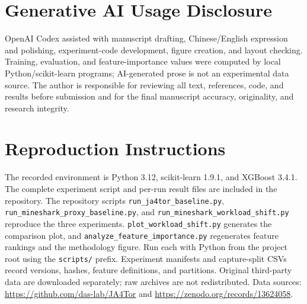 \documentclass[conference]{IEEEtran}
\begin{document}
\section{Generative AI Usage Disclosure}
OpenAI Codex assisted with manuscript drafting, Chinese/English expression and polishing, experiment-code development, figure creation, and layout checking. Training, evaluation, and feature-importance values were computed by local Python/scikit-learn programs; AI-generated prose is not an experimental data source. The author is responsible for reviewing all text, references, code, and results before submission and for the final manuscript accuracy, originality, and research integrity.


\appendix
\section{Reproduction Instructions}
The recorded environment is Python 3.12, scikit-learn 1.9.1, and XGBoost 3.4.1. The complete experiment script and per-run result files are included in the repository. The repository scripts \texttt{run\_ja4tor\_baseline.py}, \texttt{run\_mineshark\_proxy\_baseline.py}, and \texttt{run\_mineshark\_workload\_shift.py} reproduce the three experiments. \texttt{plot\_workload\_shift.py} generates the comparison plot, and \texttt{analyze\_feature\_importance.py} regenerates feature rankings and the methodology figure. Run each with Python from the project root using the \texttt{scripts/} prefix. Experiment manifests and capture-split CSVs record versions, hashes, feature definitions, and partitions. Original third-party data are downloaded separately; raw archives are not redistributed. Data sources: \url{https://github.com/das-lab/JA4Tor} and \url{https://zenodo.org/records/13624058}.
\end{document}
